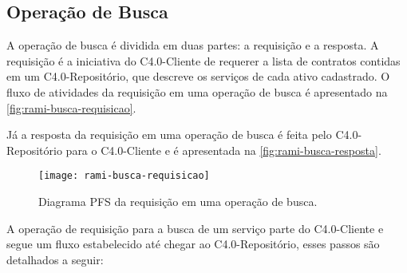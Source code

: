 \subsection{Operação de Busca}

A operação de busca é dividida em duas partes: a requisição e a resposta. A requisição é a iniciativa do C4.0-Cliente de requerer a lista de contratos contidas em um C4.0-Repositório, que descreve os serviços de cada ativo cadastrado. O fluxo de atividades da requisição em uma operação de busca é apresentado na \autoref{fig:rami-busca-requisicao}.

Já a resposta da requisição em uma operação de busca é feita pelo C4.0-Repositório para o C4.0-Cliente e é apresentada na \autoref{fig:rami-busca-resposta}.

\begin{figure}[htb]
	\centering
	\texttt{[image: rami-busca-requisicao]}
	\caption{Diagrama PFS da requisição em uma operação de busca.}
	\label{fig:rami-busca-requisicao}
\end{figure}

A operação de requisição para a busca de um serviço parte do C4.0-Cliente e segue um fluxo estabelecido até chegar ao C4.0-Repositório, esses passos são detalhados a seguir:

